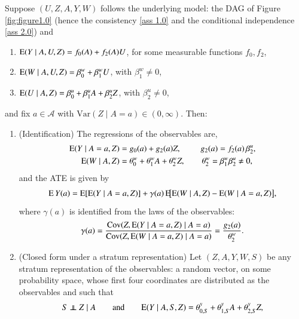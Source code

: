\begin{theorem}[Extension 1]\label{thm: extension 1}\label{lemma: identify EYa from data 1}\label{prop: underlying0_clean}\label{prop: equivalence ATE simpler}
Suppose $(U,Z,A,Y,W)$ follows the underlying model: the DAG of Figure \ref{fig:figure1.0} (hence the consistency \ref{ass 1.0} and the conditional independence \ref{ass 2.0}) and
\begin{enumerate}
\item $\mathrm{E}(Y \mid A,U,Z) = f_0(A) + f_2(A)U$, for some measurable functions $f_0, f_2$, \label{ass: first ass underlying clean}
\item $\mathrm{E}(W \mid A,U,Z) = \beta_0^w + \beta_1^w U$, with $\beta_1^w \neq 0$,
\item $\mathrm{E}(U \mid A,Z) = \beta_0^u + \beta_1^u A + \beta_2^u Z$, with $\beta_2^u \neq 0$,
\end{enumerate}
and fix $a \in \mathcal A$ with $\mathrm{Var}(Z \mid A=a) \in (0,\infty)$. Then:
\begin{enumerate}[label=\textup{(\alph*)}]
\item (Identification) The regressions of the observables are,
\begin{align}
    \mathrm{E}(Y \mid A=a,Z) &= g_0(a) + g_2(a) Z, \qquad \, \, g_2(a) = f_2(a)\,\beta_2^u, \label{eq: obs Y regression ext1}\\
    \mathrm{E}(W \mid A,Z) &= \theta_{0}^{w} + \theta_{1}^{w} A  + \theta_{2}^{w} Z, \qquad \theta_2^w = \beta_1^w \beta_2^u \neq 0, \label{eq: 2b.1}
\end{align}
and the ATE is given by
\begin{align}\label{eq: ATE underlying ext1}
\mathrm{E} \, Y(a)
=
\mathrm{E}[\mathrm{E}(Y\mid A=a,Z)]
+
\gamma(a)\,
\mathrm{E}\!\big[
\mathrm{E}(W\mid A,Z)-\mathrm{E}(W\mid A=a,Z)
\big],
\end{align}
where $\gamma(a)$ is identified from the laws of the observables:
\[
\gamma(a) = \frac{\mathrm{Cov}\!\left(Z, \mathrm{E}(Y\mid A=a,Z)\mid A=a\right)}
{\mathrm{Cov}\!\left(Z, \mathrm{E}(W\mid A=a,Z)\mid A=a\right)} = \frac{g_2(a)}{\theta_2^w}.
\]
\item (Closed form under a stratum representation) Let $(Z,A,Y,W,S)$ be any stratum representation of the observables: a random vector, on some probability space, whose first four coordinates are distributed as the observables and such that
\begin{align}
        S \independent Z \mid A \qquad \text{and} \qquad \ex(Y \mid A,S,Z) = \theta_{0,S}^{y} + \theta_{1,S}^{y} A + \theta_{2,S}^{y} Z, \label{eq: 2a.1}
\end{align}

\end{enumerate}
\end{theorem}
